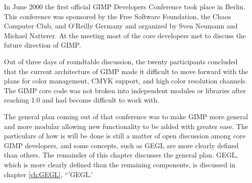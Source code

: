 In June 2000 the first official GIMP Developers Conference took place
in Berlin. This conference was sponsored by the Free Software
Foundation, the Chaos Computer Club, and O'Reilly Germany and
organized by Sven Neumann and Michael Natterer. At the meeting most of
the core developers met to discuss the future direction of GIMP.

Out of three days of roundtable discussion, the twenty participants
concluded that the current architecture of GIMP made it difficult to
move forward with the plans for color management, CMYK support, and
high color resolution channels. The GIMP core code was not broken into
independent modules or libraries after reaching 1.0 and had become
difficult to work with. 

The general plan coming out of that conference was to make GIMP more
general and more modular allowing new functionality to be added with
greater ease. The particulars of how is will be done is still a matter
of open discussion among core GIMP developers, and some concepts, such
as GEGL are more clearly defined than others. The remainder of this
chapter discusses the general plan. GEGL, which is more clearly
defined than the remaining components, is discussed in chapter
\ref{ch:GEGL}, ``'GEGL.'
